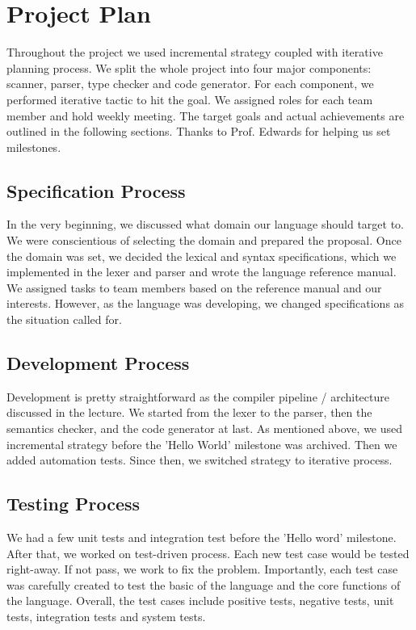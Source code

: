 \documentclass[12pt]{article} %
\begin{document}
\section{Project Plan}

Throughout the project we used incremental strategy coupled with iterative planning process. We split the whole project into four major components: scanner, parser, type checker and code generator. For each component, we performed iterative tactic to hit the goal. We assigned roles for each team member and hold weekly meeting. The target goals and actual achievements are outlined in the following sections. Thanks to Prof. Edwards for helping us set milestones.

\subsection{Specification Process}
In the very beginning, we discussed what domain our language should target to. We were conscientious of selecting the domain and prepared the proposal. Once the domain was set, we decided the lexical and syntax specifications, which we implemented in the lexer and parser and wrote the language reference manual. We assigned tasks to team members based on the reference manual and our interests. However, as the language was developing, we changed specifications as the situation called for.

\subsection{Development Process}
Development is pretty straightforward as the compiler pipeline / architecture discussed in the lecture. We started from the lexer to the parser, then the semantics checker, and the code generator at last. As mentioned above, we used incremental strategy before the 'Hello World' milestone was archived. Then we added automation tests. Since then, we switched strategy to iterative process.

\subsection{Testing Process}
We had a few unit tests and integration test before the 'Hello word' milestone. After that, we worked on test-driven process. Each new test case would be tested right-away. If not pass, we work to fix the problem. Importantly, each test case was carefully created to test the basic of the language and the core functions of the language. Overall, the test cases include positive tests, negative tests, unit tests, integration tests and system tests.
\end{document}
